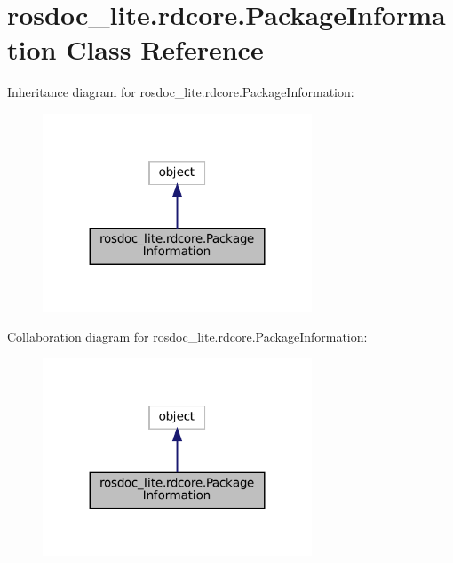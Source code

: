 \hypertarget{classrosdoc__lite_1_1rdcore_1_1PackageInformation}{}\section{rosdoc\+\_\+lite.\+rdcore.\+Package\+Information Class Reference}
\label{classrosdoc__lite_1_1rdcore_1_1PackageInformation}


Inheritance diagram for rosdoc\+\_\+lite.\+rdcore.\+Package\+Information\+:
\nopagebreak
\begin{figure}[H]
\begin{center}
\leavevmode
\includegraphics[width=227pt]{classrosdoc__lite_1_1rdcore_1_1PackageInformation__inherit__graph}
\end{center}
\end{figure}


Collaboration diagram for rosdoc\+\_\+lite.\+rdcore.\+Package\+Information\+:
\nopagebreak
\begin{figure}[H]
\begin{center}
\leavevmode
\includegraphics[width=227pt]{classrosdoc__lite_1_1rdcore_1_1PackageInformation__coll__graph}
\end{center}
\end{figure}
